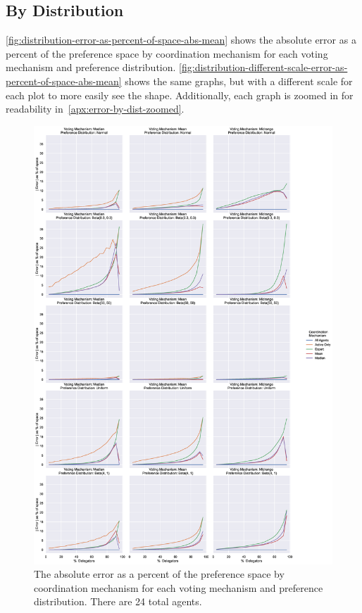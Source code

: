 \subsection{By Distribution}\label{subsec:results-distribution}
\autoref{fig:distribution-error-as-percent-of-space-abs-mean} shows
the absolute error as a percent of the preference space by coordination mechanism for
each voting mechanism and preference distribution.
\autoref{fig:distribution-different-scale-error-as-percent-of-space-abs-mean} shows
the same graphs, but with a different scale for each plot to more easily see the shape.
Additionally, each graph is zoomed in for readability
in~\autoref{apx:error-by-dist-zoomed}.

\begin{figure}[p]
    \centering
    \includegraphics[scale=0.35]
    {content/chapter2/figures/distribution_error_as_percent_of_space_abs_mean}
    \caption{
        The absolute error as a percent of the preference space by coordination
        mechanism for each voting mechanism and preference distribution.
        There are 24 total agents.
    }
    \label{fig:distribution-error-as-percent-of-space-abs-mean}
\end{figure}

